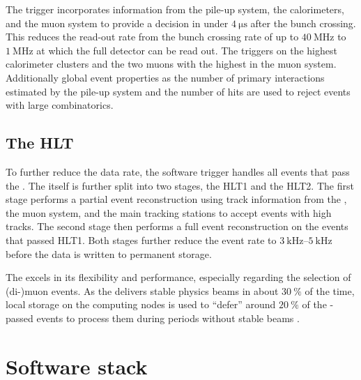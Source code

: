 The \LZero trigger incorporates information from the \VELO pile-up system, the
calorimeters, and the muon system to provide a decision in under
$\SI{4}{\micro\second}$ after the bunch crossing. This reduces the read-out rate
from the \LHC bunch crossing rate of up to $\SI{40}{\mega\hertz}$ to
$\SI{1}{\mega\hertz}$ at which the full detector can be read out. The \LZero
triggers on the highest \ET calorimeter clusters and the two muons with the
highest \pT in the muon system. Additionally global event properties as the
number of primary \protonproton interactions estimated by the \VELO pile-up
system and the number of \SPD hits are used to reject events with large
combinatorics.

\subsection{The \acl*{HLT}}
\label{sec:lhcb_experiment:trigger:hlt}

To further reduce the data rate, the \HLT software trigger handles all events
that pass the \LZero. The \HLT itself is further split into two stages, the
\acs{HLT}1 and the \acs{HLT}2. The first stage performs a partial event
reconstruction using track information from the \VELO, the muon system, and the
main tracking stations to accept events with high \pT tracks. The second \HLT
stage then performs a full event reconstruction on the events that passed
\acs{HLT}1. Both \HLT stages further reduce the event rate to
$\SIrange[range-units = single, range-phrase = -]{3}{5}{\kilo\hertz}$ before the
data is written to permanent storage.

The \HLT excels in its flexibility and performance, especially regarding the
selection of (di-)muon events. As the \LHC delivers stable physics beams in
about $\SI{30}{\percent}$ of the time, local storage on the computing nodes is
used to \enquote{defer} around $\SI{20}{\percent}$ of the \LZero-passed events
to process them during periods without stable beams \cite{Frank:2014ixa}.

\section{Software stack}
\label{sec:lhcb_experiment:software}

